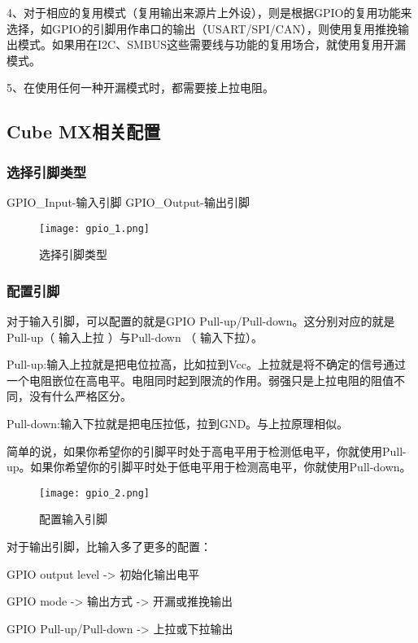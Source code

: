 \documentclass[cn,11pt]{elegantbook}
\begin{document}
4、对于相应的复用模式（复用输出来源片上外设），则是根据GPIO的复用功能来选择，如GPIO的引脚用作串口的输出（USART/SPI/CAN），则使用复用推挽输出模式。如果用在I2C、SMBUS这些需要线与功能的复用场合，就使用复用开漏模式。

5、在使用任何一种开漏模式时，都需要接上拉电阻。

\subsection{Cube MX相关配置}

\subsubsection{选择引脚类型}
 
	GPIO\_Input-输入引脚	GPIO\_Output-输出引脚
\begin{figure}[htbp]
	\centering
	\texttt{[image: gpio\_1.png]}
	\caption{选择引脚类型 \label{fig:scatter}}
\end{figure}

\subsubsection{配置引脚}

对于输入引脚，可以配置的就是GPIO Pull-up/Pull-down。这分别对应的就是Pull-up（ 输入上拉 ）与Pull-down （ 输入下拉）。

Pull-up:输入上拉就是把电位拉高，比如拉到Vcc。上拉就是将不确定的信号通过一个电阻嵌位在高电平。电阻同时起到限流的作用。弱强只是上拉电阻的阻值不同，没有什么严格区分。

Pull-down:输入下拉就是把电压拉低，拉到GND。与上拉原理相似。

简单的说，如果你希望你的引脚平时处于高电平用于检测低电平，你就使用Pull-up。如果你希望你的引脚平时处于低电平用于检测高电平，你就使用Pull-down。

\begin{figure}[htbp]
	\centering
	\texttt{[image: gpio\_2.png]}
	\caption{配置输入引脚 \label{fig:scatter}}
\end{figure}

\newpage


对于输出引脚，比输入多了更多的配置：

GPIO output level -> 初始化输出电平 

GPIO mode -> 输出方式 -> 开漏或推挽输出

GPIO Pull-up/Pull-down -> 上拉或下拉输出
\end{document}
